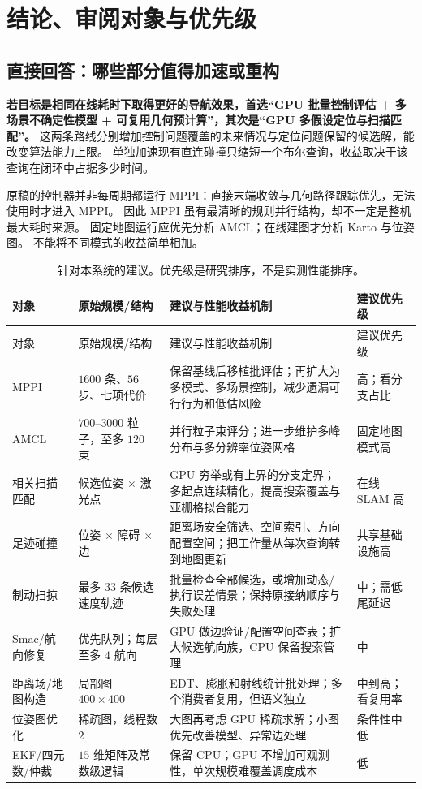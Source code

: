 \section{结论、审阅对象与优先级}
\subsection{直接回答：哪些部分值得加速或重构}
\textbf{若目标是相同在线耗时下取得更好的导航效果，首选“GPU 批量控制评估 + 多场景不确定性模型 + 可复用几何预计算”，其次是“GPU 多假设定位与扫描匹配”。}
这两条路线分别增加控制问题覆盖的未来情况与定位问题保留的候选解，能改变算法能力上限。
单独加速现有直连碰撞只缩短一个布尔查询，收益取决于该查询在闭环中占据多少时间。

原稿的控制器并非每周期都运行 MPPI：直接末端收敛与几何路径跟踪优先，无法使用时才进入 MPPI。
因此 MPPI 虽有最清晰的规则并行结构，却不一定是整机最大耗时来源。
固定地图运行应优先分析 AMCL；在线建图才分析 Karto 与位姿图。
不能将不同模式的收益简单相加。

\begin{longtable}{p{}p{}p{}p{}}
\caption{针对本系统的建议。优先级是研究排序，不是实测性能排序。}\\
\toprule 对象 & 原始规模/结构 & 建议与性能收益机制 & 建议优先级\\\midrule\endfirsthead
\toprule 对象 & 原始规模/结构 & 建议与性能收益机制 & 建议优先级\\\midrule\endhead
MPPI & $1600$ 条、$56$ 步、七项代价 & 保留基线后移植批评估；再扩大为多模式、多场景控制，减少遗漏可行行为和低估风险 & 高；看分支占比\\
AMCL & $700$--$3000$ 粒子，至多 $120$ 束 & 并行粒子束评分；进一步维护多峰分布与多分辨率位姿网格 & 固定地图模式高\\
相关扫描匹配 & 候选位姿 $\times$ 激光点 & GPU 穷举或有上界的分支定界；多起点连续精化，提高搜索覆盖与亚栅格拟合能力 & 在线 SLAM 高\\
足迹碰撞 & 位姿 $\times$ 障碍 $\times$ 边 & 距离场安全筛选、空间索引、方向配置空间；把工作量从每次查询转到地图更新 & 共享基础设施高\\
制动扫掠 & 最多 $33$ 条候选速度轨迹 & 批量检查全部候选，或增加动态/执行误差情景；保持原接纳顺序与失败处理 & 中；需低尾延迟\\
Smac/航向修复 & 优先队列；每层至多 $4$ 航向 & GPU 做边验证/配置空间查表；扩大候选航向族，CPU 保留搜索管理 & 中\\
距离场/地图构造 & 局部图 $400\times400$ & EDT、膨胀和射线统计批处理；多个消费者复用，但语义独立 & 中到高；看复用率\\
位姿图优化 & 稀疏图，线程数 $2$ & 大图再考虑 GPU 稀疏求解；小图优先改善模型、异常边处理 & 条件性中低\\
EKF/四元数/仲裁 & $15$ 维矩阵及常数级逻辑 & 保留 CPU；GPU 不增加可观测性，单次规模难覆盖调度成本 & 低\\
\bottomrule
\end{longtable}

